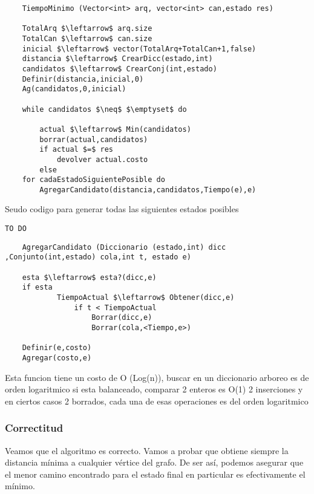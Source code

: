 \lstset{basicstyle=\large}
\begin{lstlisting}
	TiempoMinimo (Vector<int> arq, vector<int> can,estado res)

	TotalArq $\leftarrow$ arq.size
	TotalCan $\leftarrow$ can.size
	inicial $\leftarrow$ vector(TotalArq+TotalCan+1,false)
	distancia $\leftarrow$ CrearDicc(estado,int)
	candidatos $\leftarrow$ CrearConj(int,estado)
	Definir(distancia,inicial,0)
	Ag(candidatos,0,inicial)

	while candidatos $\neq$ $\emptyset$ do

		actual $\leftarrow$ Min(candidatos)
		borrar(actual,candidatos)
		if actual $=$ res
			devolver actual.costo
		else
	for cadaEstadoSiguientePosible do
		AgregarCandidato(distancia,candidatos,Tiempo(e),e)

\end{lstlisting}

Seudo codigo para generar todas las siguientes estados posibles
\lstset{basicstyle=\large}

\begin{lstlisting}
TO DO
\end{lstlisting}

\lstset{basicstyle=\large}
\begin{lstlisting}
	AgregarCandidato (Diccionario (estado,int) dicc ,Conjunto(int,estado) cola,int t, estado e)

	esta $\leftarrow$ esta?(dicc,e)
	if esta
			TiempoActual $\leftarrow$ Obtener(dicc,e)
				if t < TiempoActual
					Borrar(dicc,e)
					Borrar(cola,<Tiempo,e>)

	Definir(e,costo)
	Agregar(costo,e)

\end{lstlisting}

Esta funcion tiene un costo de O (Log(n)), buscar en un diccionario arboreo es de orden logaritmico si esta balanceado, comparar 2 enteros es O(1) 2 inserciones
y en ciertos casos 2 borrados, cada una de esas operaciones es del orden logaritmico


	\subsubsection{Correctitud}

Veamos que el algoritmo es correcto. Vamos a probar que obtiene siempre la distancia mínima a cualquier vértice del grafo. De ser así, podemos asegurar que el menor camino encontrado para el estado final en particular es efectivamente el mínimo.
\\

